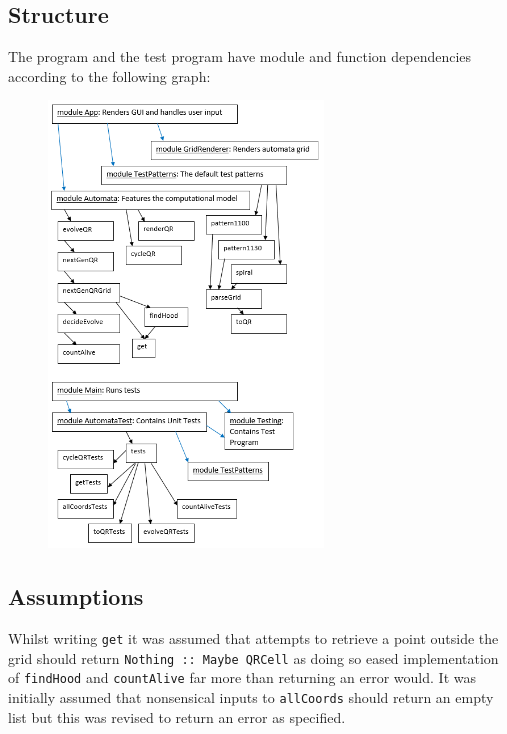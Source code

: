 \documentclass[11pt]{article}
\begin{document}
\subsection{Structure}
The program and the test program have module and function dependencies according to the following graph: 
  \begin{figure}[H]
    \centering
    \includegraphics[width=0.65\textwidth]{funcDep.png}
  \end{figure}
\newpage


 \subsection{Assumptions}%
Whilst writing \verb|get| it was assumed that attempts to retrieve a point outside the grid should return \verb|Nothing :: Maybe QRCell| as doing so eased implementation of \verb|findHood| and \verb|countAlive| far more than returning an error would. It was initially assumed that nonsensical inputs to \verb|allCoords| should return an empty list but this was revised to return an error as specified.

\end{document}
